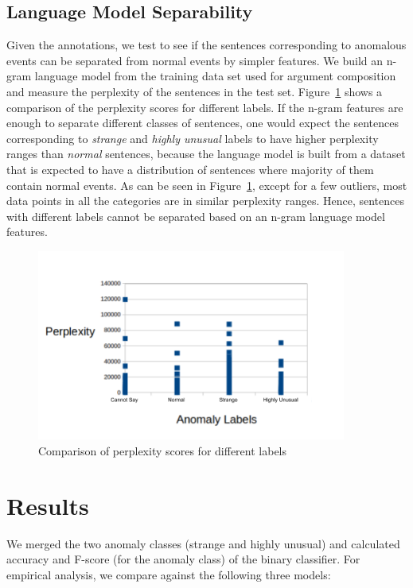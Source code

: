 \subsection{Language Model Separability}
Given the annotations, we test to see if the
sentences corresponding to anomalous events can be separated from normal events 
by simpler 
features.  We build an n-gram language model from the training data set used for 
argument composition and 
measure the perplexity of the sentences in the test set.  
Figure~\ref{fig:nem_lm_ppl} shows
a comparison of the perplexity scores for different labels. If the n-gram 
features are enough 
to separate different classes of sentences, one would expect the sentences 
corresponding to 
\textit{strange} and \textit{highly unusual} labels to have higher perplexity 
ranges than \textit{normal}
sentences, because the language model is built from a dataset that is expected 
to have a distribution of
sentences where majority of them contain normal events.  As can be seen in 
Figure~\ref{fig:nem_lm_ppl}, 
except for a few outliers, most data points in all the categories are in similar 
perplexity ranges.
Hence, sentences with different labels cannot be separated based on an n-gram 
language model features.

\begin{figure}
  \begin{center}
  \includegraphics[width=4in]{figures/perplexity-comparison.png}
  \caption{Comparison of perplexity scores for different labels}\label{fig:nem_lm_ppl}
  \end{center}
\end{figure}

\section{Results}
We merged the two anomaly classes (strange and highly unusual) and calculated accuracy and F-score (for the anomaly class) of the binary
classifier. For empirical analysis, we compare against the following three
models:

